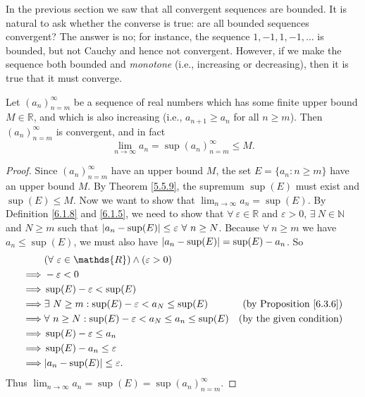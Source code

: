 \begin{note}
In the previous section we saw that all convergent sequences are bounded.
It is natural to ask whether the converse is true:
are all bounded sequences convergent?
The answer is no;
for instance, the sequence \(1, -1, 1, -1, \dots\) is bounded, but not Cauchy and hence not convergent.
However, if we make the sequence both bounded and \emph{monotone} (i.e., increasing or decreasing), then it is true that it must converge.
\end{note}

\begin{proposition}\label{6.3.8}
Let \((a_n)_{n = m}^\infty\) be a sequence of real numbers which has some finite upper bound \(M \in \mathds{R}\), and which is also increasing (i.e., \(a_{n + 1} \geq a_n\) for all \(n \geq m\)).
Then \((a_n)_{n = m}^\infty\) is convergent, and in fact
\[
    \lim_{n \to \infty} a_n = \sup(a_n)_{n = m}^\infty \leq M.
\]
\end{proposition}

\begin{proof}
Since \((a_n)_{n = m}^\infty\) have an upper bound \(M\), the set \(E = \{a_n : n \geq m\}\) have an upper bound \(M\).
By Theorem \ref{5.5.9}, the supremum \(\sup(E)\) must exist and \(\sup(E) \leq M\).
Now we want to show that \(\lim_{n \to \infty} a_n = \sup(E)\).
By Definition \ref{6.1.8} and \ref{6.1.5}, we need to show that \(\forall\ \varepsilon \in \mathds{R}\) and \(\varepsilon > 0\), \(\exists\ N \in \mathds{N}\) and \(N \geq m\) such that \(\abs*{a_n - \sup(E)} \leq \varepsilon \ \forall\ n \geq N\).
Because \(\forall\ n \geq m\) we have \(a_n \leq \sup(E)\), we must also have \(\abs*{a_n - \sup(E)} = \sup(E) - a_n\).
So
\begin{align*}
& (\forall\ \varepsilon \in \mathds{R}) \land (\varepsilon > 0) \\
\implies & -\varepsilon < 0 \\
\implies & \sup(E) - \varepsilon < \sup(E) \\
\implies & \exists\ N \geq m : \sup(E) - \varepsilon < a_N \leq \sup(E) & \text{(by Proposition \ref{6.3.6})} \\
\implies & \forall\ n \geq N : \sup(E) - \varepsilon < a_N \leq a_n \leq \sup(E) & \text{(by the given condition)} \\
\implies & \sup(E) - \varepsilon \leq a_n \\
\implies & \sup(E) - a_n \leq \varepsilon \\
\implies & \abs*{a_n - \sup(E)} \leq \varepsilon.
\end{align*}
Thus \(\lim_{n \to \infty} a_n = \sup(E) = \sup(a_n)_{n = m}^\infty\).
\end{proof}

